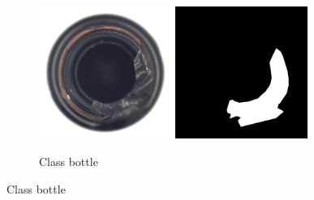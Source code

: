 \begin{figure}[ht]
    \captionsetup[subfigure]{justification=centering}
    \centering
    \begin{subfigure}[b]{0.3\textwidth}
        \centering
        \includegraphics[width=0.475\textwidth]{figures/mvtecadexampleimages/bottle000.png}
        \includegraphics[width=0.475\textwidth]{figures/mvtecadexampleimages/bottle000_mask.png}
        \caption*{Class bottle}


\end{subfigure}
\end{figure}
